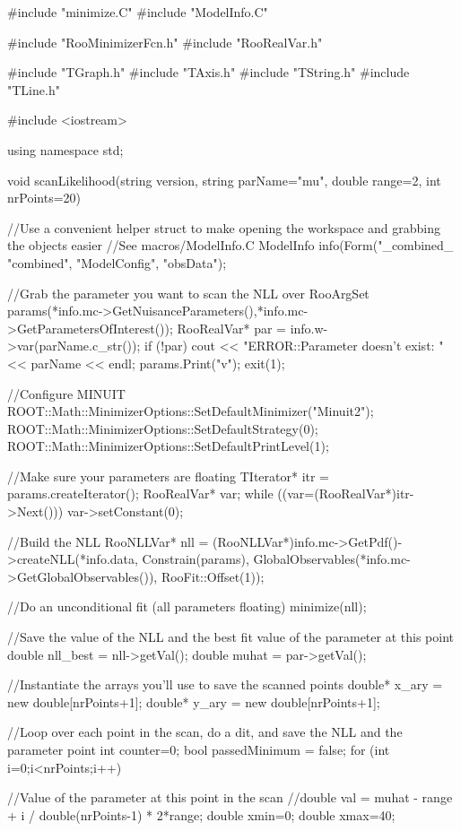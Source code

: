 #include "minimize.C"
#include "ModelInfo.C"

#include "RooMinimizerFcn.h"
#include "RooRealVar.h"

#include "TGraph.h"
#include "TAxis.h"
#include "TString.h"
#include "TLine.h"

#include <iostream>

using namespace std;

void scanLikelihood(string version, string parName="mu", double range=2, int nrPoints=20)
{
  //Use a convenient helper struct to make opening the workspace and grabbing the objects easier
  //See macros/ModelInfo.C
  ModelInfo info(Form("_combined_%
		 "combined",
		 "ModelConfig",
		 "obsData");

  //Grab the parameter you want to scan the NLL over
  RooArgSet params(*info.mc->GetNuisanceParameters(),*info.mc->GetParametersOfInterest());
  RooRealVar* par = info.w->var(parName.c_str());
  if (!par)
  {
    cout << "ERROR::Parameter doesn't exist: " << parName << endl;
    params.Print("v");
    exit(1);
  }

  //Configure MINUIT
  ROOT::Math::MinimizerOptions::SetDefaultMinimizer("Minuit2");
  ROOT::Math::MinimizerOptions::SetDefaultStrategy(0);
  ROOT::Math::MinimizerOptions::SetDefaultPrintLevel(1);

  //Make sure your parameters are floating
  TIterator* itr = params.createIterator();
  RooRealVar* var;
  while ((var=(RooRealVar*)itr->Next()))
  {
    var->setConstant(0);
  }

  //Build the NLL
  RooNLLVar* nll = (RooNLLVar*)info.mc->GetPdf()->createNLL(*info.data, Constrain(params),
							    GlobalObservables(*info.mc->GetGlobalObservables()),
							    RooFit::Offset(1));

  //Do an unconditional fit (all parameters floating)
  minimize(nll);

  //Save the value of the NLL and the best fit value of the parameter at this point
  double nll_best = nll->getVal();
  double muhat = par->getVal();

  //Instantiate the arrays you'll use to save the scanned points
  double* x_ary = new double[nrPoints+1];
  double* y_ary = new double[nrPoints+1];

  //Loop over each point in the scan, do a dit, and save the NLL and the parameter point
  int counter=0;
  bool passedMinimum = false;
  for (int i=0;i<nrPoints;i++)
  {
    //Value of the parameter at this point in the scan
    //double val = muhat - range + i / double(nrPoints-1) * 2*range;
    double xmin=0;
   double xmax=40;

}}
